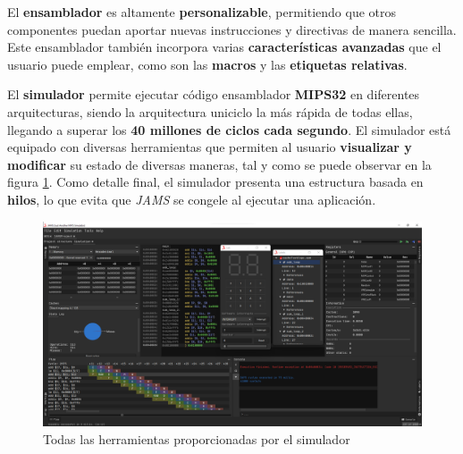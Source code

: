 El \textbf{ensamblador} es altamente \textbf{personalizable},
permitiendo que otros componentes puedan aportar nuevas instrucciones y
directivas de manera sencilla.
Este ensamblador también incorpora varias \textbf{características avanzadas}
que el usuario puede emplear, como son las \textbf{macros} y las
\textbf{etiquetas relativas}.

El \textbf{simulador} permite ejecutar código ensamblador
\textbf{MIPS32} en diferentes arquitecturas, siendo la arquitectura
uniciclo la más rápida de todas ellas, llegando a superar los
\textbf{40 millones de ciclos cada segundo}.
El simulador está equipado con diversas herramientas que
permiten al usuario \textbf{visualizar y modificar} su estado
de diversas maneras, tal y como se puede observar en la figura \ref{fig:mips-tools}.
Como detalle final, el simulador presenta una estructura basada en
\textbf{hilos}, lo que evita que \textit{JAMS} se congele al ejecutar
una aplicación.

\begin{figure}[!t]
    \centering
    \includegraphics[width=\textwidth]{images/result/mips-tools}
    \caption{Todas las herramientas proporcionadas por el simulador}
    \label{fig:mips-tools}
    \vspace{12cm}
\end{figure}
